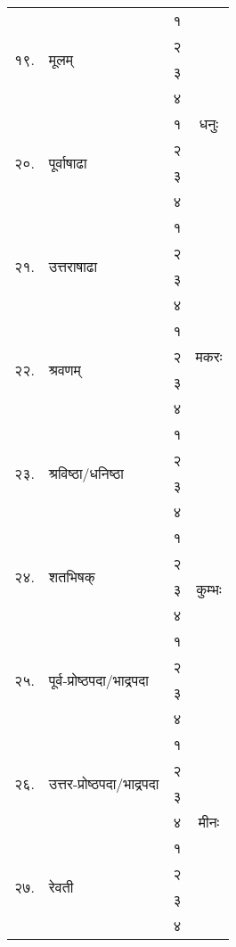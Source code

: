 {\begin{tabular}{|l@{~}l|>{\tiny}c|c|}
\multirow{4}{*}{१९.} & \multirow{4}{*}{मूलम्}                    & १&   \multirow{9}{*}{धनुः}\\
&& २& \\
&& ३& \\
&& ४& \\
\cline{1-3}\multirow{4}{*}{२०.} & \multirow{4}{*}{पूर्वाषाढा}               & १&   \\
&& २& \\
&& ३& \\
&& ४& \\
\cline{1-3}\multirow{4}{*}{२१.} & \multirow{4}{*}{उत्तराषाढा}               & १&   \\
\cline{3-4} & & २&  \multirow{9}{*}{मकरः}\\
&& ३& \\
&& ४& \\
\cline{1-3}\multirow{4}{*}{२२.} & \multirow{4}{*}{श्रवणम्}                  & १&   \\
&& २& \\
&& ३& \\
&& ४& \\
\cline{1-3}\multirow{4}{*}{२३.} & \multirow{4}{*}{श्रविष्ठा/धनिष्ठा}        & १&   \\
&& २& \\
\cline{3-4} & & ३&  \multirow{9}{*}{कुम्भः}\\
&& ४& \\
\cline{1-3}\multirow{4}{*}{२४.} & \multirow{4}{*}{शतभिषक्}                  & १&   \\
&& २& \\
&& ३& \\
&& ४& \\
\cline{1-3}\multirow{4}{*}{२५.} & \multirow{4}{*}{पूर्व-प्रोष्ठपदा/भाद्रपदा}& १&   \\
&& २& \\
&& ३& \\
\cline{3-4} & & ४&  \multirow{9}{*}{मीनः}\\
\cline{1-3}\multirow{4}{*}{२६.} & \multirow{4}{*}{उत्तर-प्रोष्ठपदा/भाद्रपदा}& १&   \\
&& २& \\
&& ३& \\
&& ४& \\
\cline{1-3}\multirow{4}{*}{२७.} & \multirow{4}{*}{रेवती}                    & १&   \\
&& २& \\
&& ३& \\
&& ४& \\\hline
\end{tabular}
}

